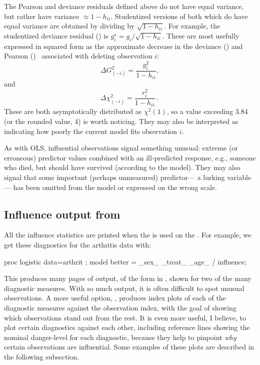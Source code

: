 The Pearson and deviance residuals defined above do not have equal
variance, but rather have variance $\approx 1-h_{ii}$.  Studentized versions
of both which do have equal variance
are obtained by dividing by $\sqrt{1-h_{ii}}$.  For example, the
studentized deviance residual () is $g_i^\star = g_i /
\sqrt{1-h_{ii}}$.
These are most usefully expressed in squared form as the approximate decrease in the
deviance () and Pearson () \chisq\ 
associated with deleting observation $i$:
\begin{equation*}%
  \Delta G_{(-i)}^2 = \frac{g_i^2}{1-h_{ii}}
  \comma
\end{equation*}
and
\begin{equation*}%
  \Delta \chi_{(-i)}^2 = \frac{r_i^2}{1-h_{ii}}
  \period
\end{equation*}
These are both asymptotically distributed as $\chi^2 (1)$, so a value
exceeding 3.84 (or the rounded value, 4) is worth noticing.
They may also be interpreted as indicating how poorly the current
model fits observation $i$.

As with OLS, influential observations signal something unusual:
extreme (or erroneous) predictor values combined with an ill-predicted
response, e.g., someone who died, but should have survived (according to the
model).  They may also signal that some important (perhaps unmeasured)
predictor--- a lurking variable--- has been omitted from the model \citep{Joiner:81} or expressed
on the wrong scale.

\subsection{Influence output from }
All the influence statistics are
printed when the  is used on the .
For example, we get these diagnostics for the arthritis data with:
\begin{listing}
proc logistic data=arthrit ;
   model better = _sex_ _treat_ _age_ / influence;
\end{listing}

This produces many pages of output, of the form in ,
shown for two of the many diagnostic measures.
With so much output, it is often difficult
to spot unusual observations.  A more useful option, ,
produces index plots of each of the diagnostic measures against
the observation index, with the goal of showing which observations
stand out from the rest.
It is even more useful, I believe, to plot certain diagnostics
against each other, including reference lines showing the nominal
danger-level for each diagnostic,  because they help to pinpoint
\emph{why} certain observations are influential.
Some examples of these plots are described in the following subsection.

